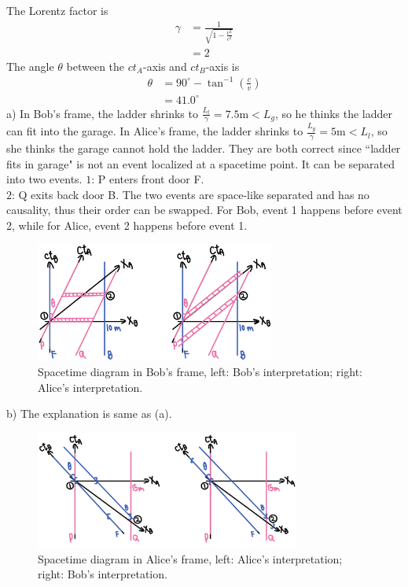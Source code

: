 \documentclass[12pt]{book} %
\numberwithin{equation}{chapter}
\def\c{\gamma}
\begin{document}
\begin{solbox}
The Lorentz factor is
\begin{align*}
\c&=\frac{1}{\sqrt{1-\frac{v^2}{c^2}}}\\
&=2
\end{align*}
The angle $\theta$ between the $ct_{A}$-axis and $ct_{B}$-axis is
\begin{align*}
\theta&=90^\circ-\tan^{-1}\left(\frac{c}{v}\right)\\
&=41.0^\circ
\end{align*}
a) In Bob's frame, the ladder shrinks to $\frac{L_{l}}{\c}=7.5\text{m}<L_{g}$, so he thinks the ladder can fit into the garage. In Alice's frame, the ladder shrinks to $\frac{L_{g}}{\c}=5\text{m}<L_{l}$, so she thinks the garage cannot hold the ladder. They are both correct since ``ladder fits in garage" is not an event localized at a spacetime point. It can be separated into two events.\bigskip\newline
$1$: P enters front door F.\\
$2$: Q exits back door B.\bigskip\newline
The two events are space-like separated and has no causality, thus their order can be swapped. For Bob, event 1 happens before event 2, while for Alice, event 2 happens before event 1.\bigskip\newline
\begin{figure}[H]
\centering
\includegraphics[width=0.7\textwidth]{Bob's spacetime diagram}
\caption{Spacetime diagram in Bob's frame, left: Bob's interpretation; right: Alice's interpretation.}
\end{figure}
\bigskip
\noindent b) The explanation is same as (a).
\begin{figure}[H]
\centering
\includegraphics[width=0.775\textwidth]{Alice's spacetime diagram}
\caption{Spacetime diagram in Alice's frame, left: Alice's interpretation; right: Bob's interpretation.}
\end{figure}
\end{solbox}
\end{document}
